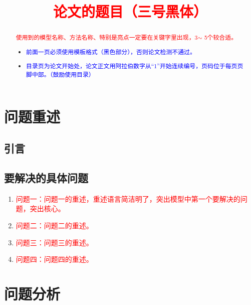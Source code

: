 \documentclass[12pt,a4paper]{nmmcm}
\title{\textcolor{red}{论文的题目（三号黑体）}}
\date{}
\begin{document}
\begin{abstract}


\begin{keywords}
{\song\xiaosihao
\textcolor{red}{使用到的模型名称、方法名称、特别是亮点一定要在关键字里出现，3$\sim$ 5个较合适。}}
\end{keywords}

\begin{itemize}
  \item \textcolor{blue}{前面一页必须使用模板格式（黑色部分），否则论文检测不通过。}
  \item \textcolor{blue}{ 目录页为论文开始处，论文正文用阿拉伯数字从“1”开始连续编号，页码位于每页页脚中部。（鼓励使用目录）}
\end{itemize}

\end{abstract}
\maketitle
\renewcommand{\contentsname}{\centerline{\sanhao\bfseries\HEI 目\quad 录}}
\tableofcontents

\newpage
\setcounter{page}{1}
\pagestyle{fancy}
\section{问题重述}
\subsection{引言}


\subsection{要解决的具体问题}
\begin{enumerate}
  \item \textcolor{red}{问题一：问题一的重述，重述语言简洁明了，突出模型中第一个要解决的问题，突出核心。}
  \item \textcolor{red}{问题二：问题二的重述。}
  \item \textcolor{red}{问题三：问题三的重述。}
  \item \textcolor{red}{问题四：问题四的重述。}
\end{enumerate}

\section{问题分析}
\end{document}
